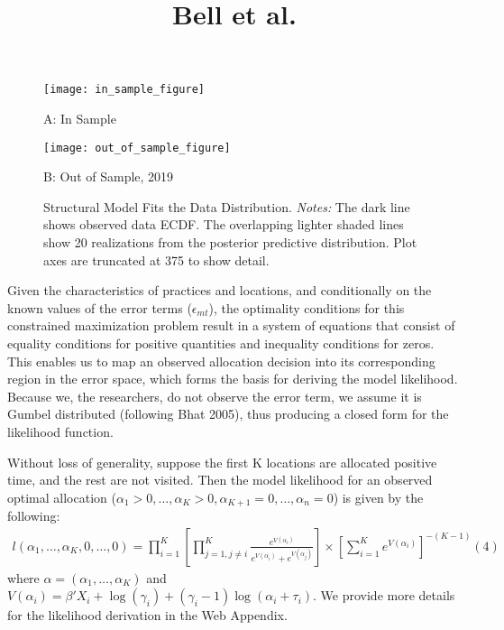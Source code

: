 \documentclass{article}
\begin{document}
\title{Bell et al.}
\date{}
\maketitle

\begin{figure}[h]
\centering
\begin{minipage}{0.48\textwidth}
\centering
\texttt{[image: in\_sample\_figure]}
\caption{A: In Sample}
\label{fig:in_sample}
\end{minipage}
\hfill
\begin{minipage}{0.48\textwidth}
\centering
\texttt{[image: out\_of\_sample\_figure]}
\caption{B: Out of Sample, 2019}
\label{fig:out_of_sample}
\end{minipage}
\caption{Structural Model Fits the Data Distribution. \textit{Notes:} The dark line shows observed data ECDF. The overlapping lighter shaded lines show 20 realizations from the posterior predictive distribution. Plot axes are truncated at 375 to show detail.}
\label{fig:structural_model}
\end{figure}

Given the characteristics of practices and locations, and conditionally on the known values of the error terms ($\epsilon_{mt}$), the optimality conditions for this constrained maximization problem result in a system of equations that consist of equality conditions for positive quantities and inequality conditions for zeros. This enables us to map an observed allocation decision into its corresponding region in the error space, which forms the basis for deriving the model likelihood. Because we, the researchers, do not observe the error term, we assume it is Gumbel distributed (following Bhat 2005), thus producing a closed form for the likelihood function.

Without loss of generality, suppose the first K locations are allocated positive time, and the rest are not visited. Then the model likelihood for an observed optimal allocation ($\alpha_1 > 0, \dots, \alpha_K > 0, \alpha_{K+1} = 0, \dots, \alpha_n = 0$) is given by the following:
\begin{align} \label{eq:1}
l(\alpha_1, \dots, \alpha_K, 0, \dots, 0) = \prod_{i=1}^K \left[ \prod_{j=1, j \ne i}^K \frac{e^{V(\alpha_i)}}{e^{V(\alpha_i)} + e^{V(\alpha_j)}} \right] \times \left[ \sum_{i=1}^K e^{V(\alpha_i)} \right]^{-(K-1)} (4)
\end{align}
where $\alpha = (\alpha_1, \dots, \alpha_K)$ and $V(\alpha_i) = \beta'X_i + \log(\gamma_i) + (\gamma_i - 1) \log(\alpha_i + \tau_i)$. We provide more details for the likelihood derivation in the Web Appendix.
\end{document}
